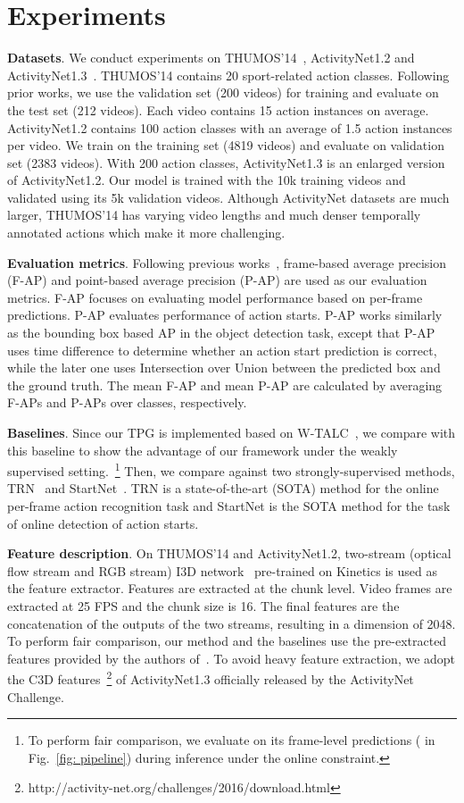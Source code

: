 \documentclass[final]{cvpr}
\begin{document}
\section{Experiments}
\textbf{Datasets}. We conduct experiments on THUMOS'14~\cite{THUMOS14}, ActivityNet1.2 and ActivityNet1.3~\cite{caba2015activitynet}. THUMOS'14 contains 20 sport-related action classes. Following prior works, we use the validation set (200 videos) for training and evaluate on the test set (212 videos). Each video contains 15 action instances on average. ActivityNet1.2 contains 100 action classes with an average of 1.5 action instances per video. We train on the training set (4819 videos) and evaluate on validation set (2383 videos). With 200 action classes, ActivityNet1.3 is an enlarged version of ActivityNet1.2. Our model is trained with the 10k training videos and validated using its 5k validation videos. Although ActivityNet datasets are much larger, THUMOS'14 has varying video lengths and much denser temporally annotated actions which make it more challenging.

\textbf{Evaluation metrics}. Following previous works~\cite{de2016online,gao2017red,xu2019trn,shou2018online,gao2019startnet}, frame-based average precision (F-AP) and point-based average precision (P-AP) are used as our evaluation metrics. F-AP focuses on evaluating model performance based on per-frame predictions. P-AP evaluates performance of action starts. P-AP works similarly as the bounding box based AP in the object detection task, except that P-AP uses time difference to determine whether an action start prediction is correct, while the later one uses Intersection over Union between the predicted box and the ground truth. The mean F-AP and mean P-AP are calculated by averaging F-APs and P-APs over classes, respectively.

\textbf{Baselines}. Since our TPG is implemented based on W-TALC~\cite{paul2018w}, we compare with this baseline to show the advantage of our framework under the weakly supervised setting.~\footnote{To perform fair comparison, we evaluate on its frame-level predictions ( in Fig.~\ref{fig: pipeline}) during inference under the online constraint.} Then, we compare against two strongly-supervised methods, TRN~\cite{xu2019trn} and StartNet~\cite{gao2019startnet}. TRN is a state-of-the-art (SOTA) method for the online per-frame action recognition task and StartNet is the SOTA method for the task of online detection of action starts.

\textbf{Feature description}. On THUMOS'14 and ActivityNet1.2, two-stream (optical flow stream and RGB stream) I3D network~\cite{carreira2017quo} pre-trained on Kinetics is used as the feature extractor. Features are extracted at the chunk level. Video frames are extracted at 25 FPS and the chunk size is 16. The final features are the concatenation of the outputs of the two streams, resulting in a dimension of 2048. To perform fair comparison, our method and the baselines use the pre-extracted features provided by the authors of~\cite{paul2018w}. To avoid heavy feature extraction, we adopt the C3D features~\footnote{http://activity-net.org/challenges/2016/download.html} of ActivityNet1.3 officially released by the ActivityNet Challenge.
\end{document}
